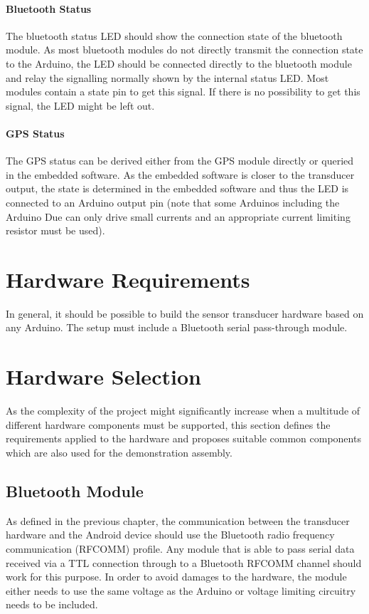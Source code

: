 \paragraph{Bluetooth Status}
The bluetooth status LED should show the connection state of the bluetooth module. As most bluetooth modules do not directly transmit the connection state to the Arduino, the LED should be connected directly to the bluetooth module and relay the signalling normally shown by the internal status LED. Most modules contain a state pin to get this signal. If there is no possibility to get this signal, the LED might be left out.

\paragraph{GPS Status}
The GPS status can be derived either from the GPS module directly or queried in the embedded software. As the embedded software is closer to the transducer output, the state is determined in the embedded software and thus the LED is connected to an Arduino output pin (note that some Arduinos including the Arduino Due can only drive small currents and an appropriate current limiting resistor must be used).

\section{Hardware Requirements}
In general, it should be possible to build the sensor transducer hardware based on any Arduino. The setup must include a Bluetooth serial pass-through module. 

\section{Hardware Selection}
As the complexity of the project might significantly increase when a multitude of different hardware components must be supported, this section defines the requirements applied to the hardware and proposes suitable common components which are also used for the demonstration assembly.

\subsection{Bluetooth Module}
As defined in the previous chapter, the communication between the transducer hardware and the Android device should use the Bluetooth radio frequency communication (RFCOMM) profile. Any module that is able to pass serial data received via a TTL connection through to a Bluetooth RFCOMM channel should work for this purpose. In order to avoid damages to the hardware, the module either needs to use the same voltage as the Arduino or voltage limiting circuitry needs to be included. 

